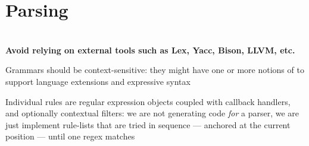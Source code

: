 
\section{Parsing}\fbeg{}\begin{frame}{}

\vspace{.5em}	

\begin{center}

{\Large%
\hspace*{-2pt}\begin{minipage}{\textwidth}
\vspace{4pt}


		


{\hspace{1.5em}\begin{minipage}[l]{.9\textwidth}\Large\centering\color{slidePartHeadColor} 	
{}\\\vspace{1em}
{\LARGE \textbf{Avoid relying on external tools such as Lex, Yacc, Bison, LLVM, etc.}}
\vspace{.7em}	
\end{minipage}}
\vspace{.1em}

\begin{minipage}{.88\textwidth}
{\LARGE \setlength{\leftmargini}{30pt}\begin{enumerate}
\dmitem {\dksp} Grammars should be context-sensitive: they might 
have one or more notions of  to support language extensions and expressive syntax \vspace{10pt}

\dmitem {\dksp} Individual rules are regular expression objects coupled with callback 
handlers, and optionally contextual filters: we are not generating code 
\textsl{for} a parser, we are just implement rule-lists that are tried 
in sequence --- anchored 
at the current  position --- until one regex matches  \vspace{10pt}


\end{enumerate}}
\end{minipage}
\end{minipage}}
\end{center}
\end{frame}
